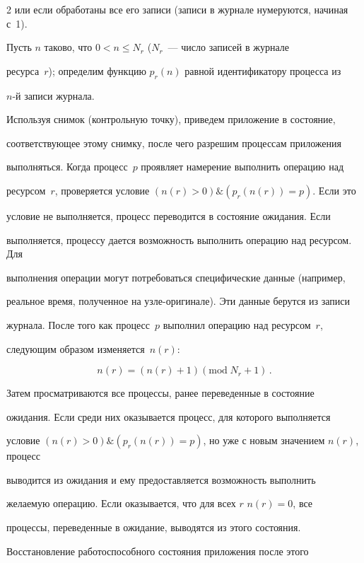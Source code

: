 \begin{multicols}{2}
или если обработаны все его записи (записи в журнале нумеруются, начиная с~1). 

Пусть $n$ таково, что $0 < n \leq N_r$ ($N_r$~--- число записей в журнале 

ресурса~$r$); определим функцию $p_r(n)$ равной идентификатору процесса из 

$n$-й записи жур\-нала. {



}



Используя снимок (контрольную точку), приведем приложение в состояние,

соответствующее этому снимку, после чего разрешим процессам приложения

выполняться. Когда процесс~$p$ проявляет намерение выполнить операцию над 

ресурсом~$r$, проверяется условие $(n(r)>0) \& (p_r(n(r)) =p)$. Если это 

условие не выполняется, процесс переводится в состояние ожидания. Если 

выполняется, процессу дается возможность выполнить операцию над ресурсом. Для 

выполнения операции могут потребоваться специфические данные (например, 

реальное время, полученное на узле-оригинале). Эти данные берутся из записи 

журнала. После того как процесс~$p$ выполнил операцию над ресурсом~$r$, 

следующим образом изменяется~$n(r)$:

$$

n(r) = (n(r) + 1)(\mathrm{mod}\;N_r  + 1)\,.

$$



Затем просматриваются все процессы, ранее переведенные в состояние

ожидания. Если среди них оказывается процесс, для которого выполняется

условие $(n(r)>0) \& (p_r(n(r)) = p)$, но уже с новым значением $n(r)$,  процесс

выводится из ожидания и ему предоставляется возможность выполнить

желаемую операцию. Если оказывается, что для всех $r$ $n(r)=0$, все

процессы, переведенные в ожидание, выводятся из этого состояния.

Восстановление работоспособного состояния приложения после этого


\end{multicols}
